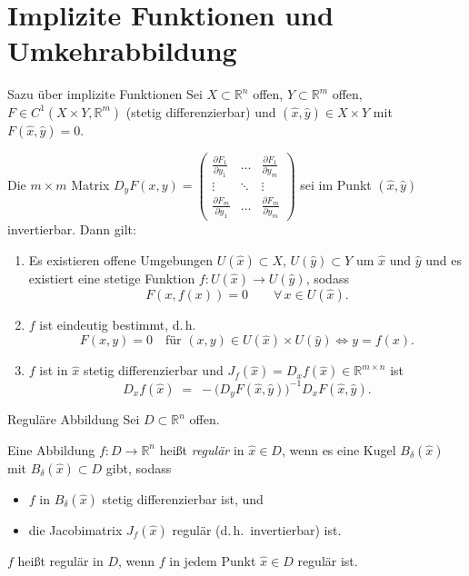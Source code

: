 \newpage
\section{Implizite Funktionen und Umkehrabbildung}
\label{4.6}

\begin{satz}{Sazu über implizite Funktionen}
    Sei $X\subset\mathbb{R}^n$ offen, $Y\subset\mathbb{R}^m$ offen, $F\in C^1(X\times Y,\mathbb{R}^m)$ (stetig differenzierbar) und $(\hat{x},\hat{y})\in X\times Y$ mit $F(\hat{x},\hat{y})=0$.

    Die $m\times m$ Matrix
    $
    D_yF(x,y)=
    \begin{pmatrix}
    \displaystyle\frac{\partial F_1}{\partial y_1} & \dots & \displaystyle\frac{\partial F_1}{\partial y_m} \\
    \vdots & \ddots & \vdots \\
    \displaystyle\frac{\partial F_m}{\partial y_1} & \dots & \displaystyle\frac{\partial F_m}{\partial y_m}
    \end{pmatrix}
    $
    sei im Punkt $(\hat{x},\hat{y})$ invertierbar. Dann gilt:

    \begin{enumerate}
        \item Es existieren offene Umgebungen $U(\hat{x})\subset X$, $U(\hat{y})\subset Y$ um $\hat{x}$ und $\hat{y}$ und es existiert eine stetige Funktion $f:U(\hat{x})\to U(\hat{y})$, sodass
        $$
        F(x,f(x))=0\qquad\forall\,x\in U(\hat{x}).
        $$

        \item $f$ ist eindeutig bestimmt, d.\,h.
        $$
        F(x,y)=0\quad\text{für }(x,y)\in U(\hat{x})\times U(\hat{y}) \iff y=f(x).
        $$

        \item $f$ ist in $\hat{x}$ stetig differenzierbar und $J_f(\hat{x})=D_x f(\hat{x})\in\mathbb{R}^{m\times n}$ ist
        $$
        D_x f(\hat{x}) \;=\; -\bigl(D_yF(\hat{x},\hat{y})\bigr)^{-1} D_xF(\hat{x},\hat{y}).
        $$
    \end{enumerate}
\end{satz}

\begin{definition}{Reguläre Abbildung}
    Sei $D\subset\mathbb{R}^n$ offen.

    Eine Abbildung $f\colon D\to\mathbb{R}^n$ heißt \emph{regulär} in $\hat{x}\in D$, wenn es eine Kugel $B_\delta(\hat{x})$ mit $B_\delta(\hat{x})\subset D$ gibt, sodass
    \begin{itemize}
    \item $f$ in $B_\delta(\hat{x})$ stetig differenzierbar ist, und
    \item die Jacobimatrix $J_f(\hat{x})$ regulär (d.\,h.\ invertierbar) ist.
    \end{itemize}

    $f$ heißt regulär in $D$, wenn $f$ in jedem Punkt $\hat{x}\in D$ regulär ist.
\end{definition}

